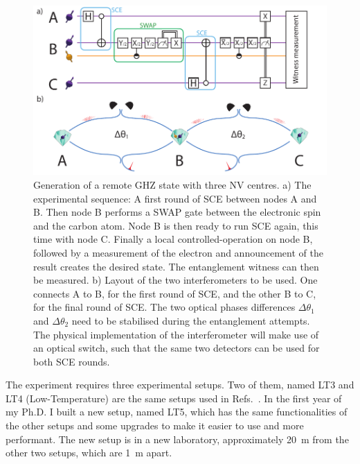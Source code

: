 \documentclass[a4paper]{article}
\begin{document}
\begin{figure}[h]
	\centering
	\includegraphics[width=\textwidth]{images/figure3}
	\caption{
		Generation of a remote GHZ state with three \ac{NV} centres.
		a) The experimental sequence: A first round of \acf{SCE} between nodes A and B. Then node B performs a \textsc{SWAP} gate between the electronic spin and the carbon atom. Node B is then ready to run \ac{SCE} again, this time with node C. Finally a local controlled-operation on node B, followed by a measurement of the electron and announcement of the result creates the desired state. The entanglement witness can then be measured.
		b) Layout of the two interferometers to be used. One connects A to B, for the first round of \ac{SCE}, and the other B to C, for the final round of \ac{SCE}. The two optical phases differences $\Delta\theta_1$ and $\Delta\theta_2$ need to be stabilised during the entanglement attempts. The physical implementation of the interferometer will make use of an optical switch, such that the same two detectors can be used for both \ac{SCE} rounds.
	}
	\label{fig:3node_scheme}
\end{figure}

The experiment requires three experimental setups. Two of them, named LT3 and LT4 (Low-Temperature) are the same setups used in Refs.~\cite{Kalb2017, Humphreys2018}.
In the first year of my Ph.D. I built a new setup, named LT5, which has the same functionalities of the other setups and some upgrades to make it easier to use and more performant. The new setup is in a new laboratory, approximately \SI{20}{m} from the other two setups, which are \SI{1}{m} apart.
\end{document}
